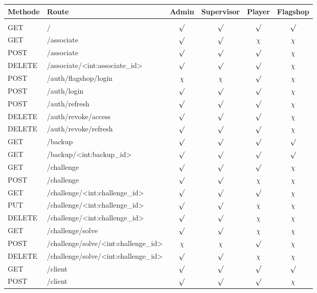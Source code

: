 \begin{table}
	\centering
	\begin{tabular}{l l c c c c}
		Methode & Route	& Admin & Supervisor & Player  & Flagshop \\ [0.5ex]
		\hline &&&&&\\
		GET		& /									& $\surd$ & $\surd$ & $\surd$ & $\surd$ \\
		GET		& /associate 						& $\surd$ & $\surd$ & $\chi$ & $\chi$ \\
		POST	& /associate						& $\surd$ & $\surd$ & $\surd$ & $\chi$ \\
		DELETE	& /associate/<int:associate\_id>	& $\surd$ & $\surd$ & $\surd$ & $\chi$ \\
		POST	& /auth/flagshop/login				& $\chi$ & $\chi$ & $\surd$ & $\chi$ \\
		POST	& /auth/login						& $\surd$ & $\surd$ & $\surd$ & $\chi$ \\
		POST	& /auth/refresh						& $\surd$ & $\surd$ & $\surd$ & $\chi$ \\
		DELETE	& /auth/revoke/access				& $\surd$ & $\surd$ & $\surd$ & $\chi$ \\
		DELETE	& /auth/revoke/refresh				& $\surd$ & $\surd$ & $\surd$ & $\chi$ \\
		GET		& /backup							& $\surd$ & $\surd$ & $\surd$ & $\surd$ \\
		GET 	& /backup/<int:backup\_id>			& $\surd$ & $\surd$ & $\surd$ & $\surd$ \\
		GET		& /challenge						& $\surd$ & $\surd$ & $\surd$ & $\chi$ \\
		POST	& /challenge						& $\surd$ & $\surd$ & $\chi$ & $\chi$ \\
		GET		& /challenge/<int:challenge\_id>	& $\surd$ & $\surd$ & $\surd$ & $\chi$ \\
		PUT		& /challenge/<int:challenge\_id>	& $\surd$ & $\surd$ & $\chi$ & $\chi$ \\
		DELETE	& /challenge/<int:challenge\_id>	& $\surd$ & $\surd$ & $\chi$ & $\chi$ \\
		GET		& /challenge/solve					& $\surd$ & $\surd$ & $\chi$ & $\chi$ \\
		POST	& /challenge/solve/<int:challenge\_id>& $\chi$ & $\chi$ & $\surd$ & $\chi$ \\
		DELETE	& /challenge/solve/<int:challenge\_id>& $\surd$ & $\surd$ & $\chi$ & $\chi$ \\
		GET 	& /client							& $\surd$ & $\surd$ & $\surd$ & $\surd$ \\
		POST	& /client							& $\surd$ & $\surd$ & $\surd$ & $\chi$ \\

\end{tabular}
\end{table}
